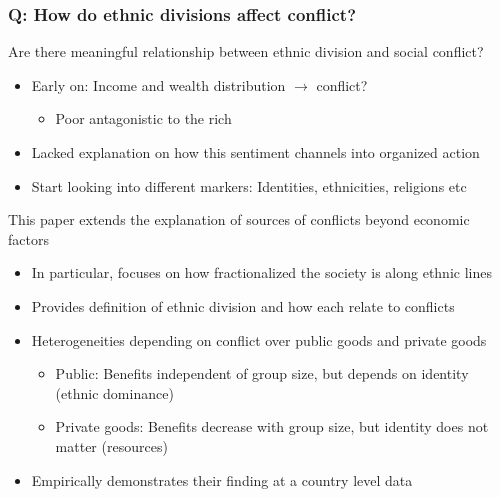 \documentclass[aspectratio=169]{beamer}
\begin{document}
\begin{frame}
\frametitle{Q: How do ethnic divisions affect conflict?} 
Are there meaningful relationship between ethnic division and social conflict?
\begin{itemize}\setlength\itemsep{3pt}
\item Early on: Income and wealth distribution $\to$ conflict?
\begin{itemize}
\item Poor antagonistic to the rich
\end{itemize}
\item Lacked explanation on how this sentiment channels into organized action
\item Start looking into different markers: Identities, ethnicities, religions etc
\end{itemize} \medskip
This paper extends the explanation of sources of conflicts beyond economic factors
\begin{itemize}\setlength\itemsep{3pt}
\item In particular, focuses on how fractionalized the society is along ethnic lines
\item Provides definition of ethnic division and how each relate to conflicts
\item Heterogeneities depending on conflict over public goods and private goods 
\begin{itemize}\setlength\itemsep{3pt}
  \item Public: Benefits independent of group size, but depends on identity (ethnic dominance)
  \item Private goods: Benefits decrease with group size, but identity does not matter (resources)
  \end{itemize}
\item Empirically demonstrates their finding at a country level data
\end{itemize} \medskip
\end{frame}
\end{document}
